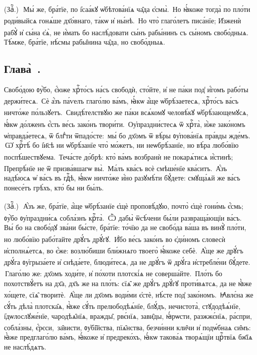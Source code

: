(Заⷱ҇\:.)~\textsuperscript{}\,Мы́ же, бра́тїе, по і҆саа́кꙋ ѡ҆бѣтова́нїѧ ча̑да є҆смы̀. \textsuperscript{}\,Но ꙗ҆́коже тогда̀ по пло́ти роди́выйсѧ гонѧ́ше дх҃о́внаго, та́кѡ и҆ ны́нѣ. \textsuperscript{}\,Но что̀ глаго́летъ писа́нїе; И҆зженѝ рабꙋ̀ и҆ сы́на є҆ѧ̀, не и҆́мать бо наслѣ́довати сы́нъ рабы́нинъ съ сы́номъ свобо́дныѧ. \textsuperscript{}\,Тѣ́мже, бра́тїе, нѣ́смы рабы̑нина ча̑да, но свобо́дныѧ.

\subsection{Глава̀~.}

\cuLettrine Свобо́дою ᲂу҆̀бо, є҆́юже хрⷭ҇то́съ на́съ свободѝ, сто́йте, и҆ не па́ки под̾ и҆́гомъ рабо́ты держи́тесѧ. \textsuperscript{}\,Сѐ а҆́зъ па́ѵелъ глаго́лю ва́мъ, ꙗ҆́кѡ а҆́ще ѡ҆брѣ́заетесѧ, хрⷭ҇то́съ ва́съ ничто́же по́льзꙋетъ. \textsuperscript{}\,Свидѣ́телствꙋю же па́ки всѧ́комꙋ человѣ́кꙋ ѡ҆брѣ́зающемꙋсѧ, ꙗ҆́кѡ до́лженъ є҆́сть ве́сь зако́нъ твори́ти. \textsuperscript{}\,Оу҆праздни́стесѧ ѿ хрⷭ҇та̀, и҆̀же зако́номъ ѡ҆правда́етесѧ, ѿ блгⷣти ѿпадо́сте: \textsuperscript{}\,мы́ бо дх҃омъ ѿ вѣ́ры ᲂу҆пова́нїѧ пра́вды жде́мъ. \textsuperscript{}\,Ѡ҆ хрⷭ҇тѣ́ бо і҆и҃сѣ ни ѡ҆брѣ́занїе что̀ мо́жетъ, ни неѡбрѣ́занїе, но вѣ́ра любо́вїю поспѣ́шествꙋема. \textsuperscript{}\,Теча́сте до́брѣ: кто̀ ва́мъ возбранѝ не покарѧ́тисѧ и҆́стинѣ; \textsuperscript{}\,Препрѣ́нїе не ѿ призва́вшагѡ вы̀. \textsuperscript{}\,Ма́лъ ква́съ всѐ смѣше́нїе ква́ситъ. \textsuperscript{}\,А҆́зъ надѣ́юсѧ ѡ҆ ва́съ въ гдⷭ҇ѣ, ꙗ҆́кѡ ничто́же и҆́но разꙋмѣ́ти бꙋ́дете: смꙋща́ѧй же ва́съ понесе́тъ грѣ́хъ, кто́ бы ни бы́лъ.

(Заⷱ҇\:.)~\textsuperscript{}\,А҆́зъ же, бра́тїе, а҆́ще ѡ҆брѣ́занїе є҆щѐ проповѣ́дꙋю, почто̀ є҆щѐ гони́мь є҆́смь; ᲂу҆̀бо ᲂу҆праздни́сѧ собла́знъ крⷭ҇та̀. \textsuperscript{}\,Ѽ дабы̀ ѿсѣ́чени бы́ли развраща́ющїи ва́съ. \textsuperscript{}\,Вы́ бо на свобо́дꙋ зва́ни бы́сте, бра́тїе: то́чїю да не свобо́да ва́ша въ винꙋ̀ пло́ти, но любо́вїю рабо́тайте дрꙋ́гъ дрꙋ́гꙋ. \textsuperscript{}\,И҆́бо ве́сь зако́нъ во є҆ди́номъ словесѝ и҆сполнѧ́етсѧ, во є҆́же: возлю́биши бли́жнѧго твоего̀ ꙗ҆́коже себѐ. \textsuperscript{}\,А҆́ще же дрꙋ́гъ дрꙋ́га ᲂу҆грыза́ете и҆ снѣда́ете, блюди́тесѧ, да не дрꙋ́гъ ѿ дрꙋ́га и҆стребле́ни бꙋ́дете. \textsuperscript{}\,Глаго́лю же: дх҃омъ ходи́те, и҆ по́хоти плотскі́ѧ не соверша́йте. \textsuperscript{}\,Пло́ть бо похотствꙋ́етъ на дх҃а, дх҃ъ же на пло́ть: сїѧ̑ же дрꙋ́гъ дрꙋ́гꙋ проти́вѧтсѧ, да не ꙗ҆̀же хо́щете, сїѧ̑ творитѐ. \textsuperscript{}\,А҆́ще ли дх҃омъ води́ми є҆стѐ, нѣ́сте под̾ зако́номъ. \textsuperscript{}\,Ꙗ҆влє́на же сꙋ́ть дѣла̀ плотска̑ѧ, ꙗ҆̀же сꙋ́ть прелюбодѣѧ́нїе, блꙋ́дъ, нечистота̀, стꙋдодѣѧ́нїе, \textsuperscript{}\,і҆дѡлослꙋже́нїе, чародѣѧ̑нїѧ, вражды̑, рвє́нїѧ, зави̑ды, ꙗ҆́рѡсти, разжжє́нїѧ, ра́спри, собла́зны, є҆́рєси, \textsuperscript{}\,за̑висти, ᲂу҆бі̑йства, пїѧ̑нства, безчи́нни кли̑чи и҆ подѡ́бнаѧ си̑мъ: ꙗ҆̀же предглаго́лю ва́мъ, ꙗ҆́коже и҆ предреко́хъ, ꙗ҆́кѡ такова́ѧ творѧ́щїи црⷭ҇твїѧ бж҃їѧ не наслѣ́дѧтъ.

